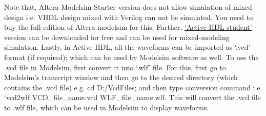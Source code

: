 Note that, Altera-Modelsim-Starter version does not allow simulation of mixed design i.e. VHDL design mixed with Verilog can not be simulated. You need to buy the full edition of Altera-modelsim for this. Further, \href{https://www.aldec.com/en/products/fpga_simulation/active_hdl_student}{`Active-HDL student'} version can be downloaded for free and can be used for mixed-modeling simulation. Lastly, in Active-HDL, all the waveforms can be imported as `.vcd' format (if required); which can be used by Modelsim software as well. To use the .vcd file in Modelsim, first convert it into `.wlf' file. For this, first go to Modelsim's transcript window and then go to the desired directory (which contains the .vcd file) e.g. cd D:/VcdFiles; and then type conversion command i.e. `vcd2wlf VCD\_file\_name.vcd WLF\_file\_name.wlf. This will convert the .vcd file to .wlf file, which can be used in Modelsim to display waveforms.

